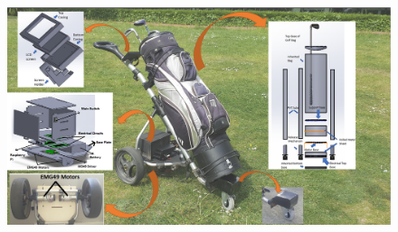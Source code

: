 \documentclass[11pt,landscape]{article}
\begin{document}
\begin{figure}[H]
    \begin{center}
        \includegraphics[width=\textwidth]{final_proposal.PNG}
    \end{center}
    \label{fig:final_proposal}
\end{figure}
\end{document}
